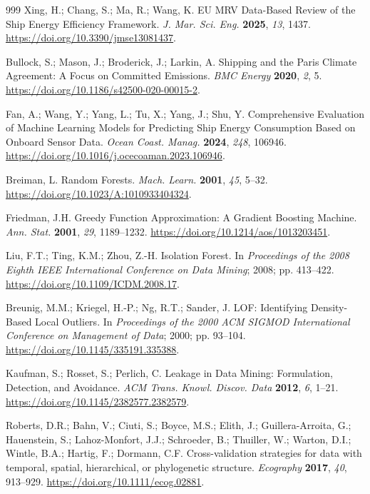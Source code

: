 \documentclass[preprints,article,submit,pdftex,oneauthor]{Definitions/mdpi}
\begin{document}
\begin{thebibliography}{999}
Xing, H.; Chang, S.; Ma, R.; Wang, K. EU MRV Data-Based Review of the Ship Energy Efficiency Framework. \textit{J. Mar. Sci. Eng.} \textbf{2025}, \textit{13}, 1437. \url{https://doi.org/10.3390/jmse13081437}.

Bullock, S.; Mason, J.; Broderick, J.; Larkin, A. Shipping and the Paris Climate Agreement: A Focus on Committed Emissions. \textit{BMC Energy} \textbf{2020}, \textit{2}, 5. \url{https://doi.org/10.1186/s42500-020-00015-2}.

Fan, A.; Wang, Y.; Yang, L.; Tu, X.; Yang, J.; Shu, Y. Comprehensive Evaluation of Machine Learning Models for Predicting Ship Energy Consumption Based on Onboard Sensor Data. \textit{Ocean Coast. Manag.} \textbf{2024}, \textit{248}, 106946. \url{https://doi.org/10.1016/j.ocecoaman.2023.106946}.

Breiman, L. Random Forests. \textit{Mach. Learn.} \textbf{2001}, \textit{45}, 5--32. \url{https://doi.org/10.1023/A:1010933404324}.

Friedman, J.H. Greedy Function Approximation: A Gradient Boosting Machine. \textit{Ann. Stat.} \textbf{2001}, \textit{29}, 1189--1232. \url{https://doi.org/10.1214/aos/1013203451}.

Liu, F.T.; Ting, K.M.; Zhou, Z.-H. Isolation Forest. In \textit{Proceedings of the 2008 Eighth IEEE International Conference on Data Mining}; 2008; pp. 413--422. \url{https://doi.org/10.1109/ICDM.2008.17}.

Breunig, M.M.; Kriegel, H.-P.; Ng, R.T.; Sander, J. LOF: Identifying Density-Based Local Outliers. In \textit{Proceedings of the 2000 ACM SIGMOD International Conference on Management of Data}; 2000; pp. 93--104. \url{https://doi.org/10.1145/335191.335388}.

Kaufman, S.; Rosset, S.; Perlich, C. Leakage in Data Mining: Formulation, Detection, and Avoidance. \textit{ACM Trans. Knowl. Discov. Data} \textbf{2012}, \textit{6}, 1--21. \url{https://doi.org/10.1145/2382577.2382579}.

Roberts, D.R.; Bahn, V.; Ciuti, S.; Boyce, M.S.; Elith, J.; Guillera-Arroita, G.; Hauenstein, S.; Lahoz-Monfort, J.J.; Schroeder, B.; Thuiller, W.; Warton, D.I.; Wintle, B.A.; Hartig, F.; Dormann, C.F. Cross-validation strategies for data with temporal, spatial, hierarchical, or phylogenetic structure. \textit{Ecography} \textbf{2017}, \textit{40}, 913--929. \url{https://doi.org/10.1111/ecog.02881}.


\end{thebibliography}
\end{document}
